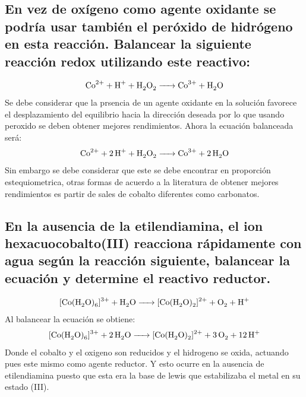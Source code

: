 \documentclass[fleqn,10pt]{SelfArx} %
\begin{document}
	\subsection[En vez de ox\'igeno]{En vez de ox\'igeno como agente oxidante se podr\'ia usar tambi\'en el per\'oxido de hidr\'ogeno en esta reacci\'on. Balancear la siguiente reacci\'on redox utilizando este reactivo:}
	\begin{equation}
	    \ce{Co^{2+} + H+ + H2O2 -> Co^{3+} + H2O}
	\end{equation}
	Se debe considerar que la prsencia de un agente oxidante en la solución favorece el desplazamiento del equilibrio hacia la dirección deseada por lo que usando peroxido se deben obtener mejores rendimientos. Ahora la ecuación balanceada será:
	\begin{equation}
	    \ce{Co^{2+} + 2H+ + H2O2 -> Co^{3+} + 2H2O}
	\end{equation}
	Sin embargo se debe considerar que este se debe encontrar en proporción estequiometrica, otras formas de acuerdo a la literatura de obtener mejores rendimientos es partir de sales de cobalto diferentes como carbonatos.
	\subsection[Ausencia de etilendiamina]{En la ausencia de la etilendiamina, el ion hexacuocobalto(III) reacciona r\'apidamente con agua seg\'un la reacci\'on siguiente, balancear la ecuaci\'on y determine el reactivo reductor.}
	\small
	\begin{equation}
	    \ce{[Co(H2O)6]^{3+} + H2O -> [Co(H2O)2]^{2+} + O2 + H+}
	\end{equation}
	Al balancear la ecuación se obtiene:
		\small
	\begin{equation}
	    \ce{[Co(H2O)6]^{3+} + 2H2O -> [Co(H2O)2]^{2+} + 3O2 + 12H+}
	\end{equation}
	Donde el cobalto y el oxigeno son reducidos y el hidrogeno se oxida, actuando pues este mismo como agente reductor. 
	Y esto ocurre en la ausencia de etilendiamina puesto que esta era la base de lewis que estabilizaba el metal en su estado (III).
	 
	\normalsize
	
\end{document}
